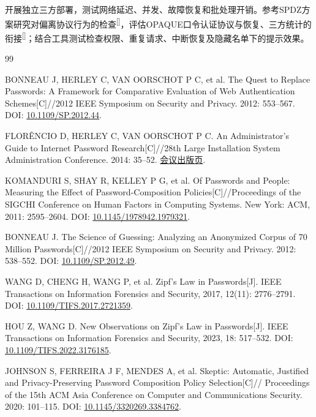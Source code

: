 \documentclass{crypto_report}
\renewcommand{\cite}[1]{\textsuperscript{[\citen{#1}]}}%
\begin{document}
开展独立三方部署，测试网络延迟、并发、故障恢复和批处理开销。参考SPDZ方案研究对偏离协议行为的检查\cite{damgard2012spdz}，评估OPAQUE口令认证协议与恢复、三方统计的衔接\cite{rfc9807opaque}；结合工具测试检查权限、重复请求、中断恢复及隐藏名单下的提示效果。

\clearpage
{}
{}
\renewcommand{\refname}{参考文献}
\begin{thebibliography}{99}

 BONNEAU J, HERLEY C, VAN OORSCHOT P C, et al. The Quest to Replace Passwords: A Framework for Comparative Evaluation of Web Authentication Schemes[C]//2012 IEEE Symposium on Security and Privacy. 2012: 553--567. DOI: \href{https://doi.org/10.1109/SP.2012.44}{10.1109/SP.2012.44}.

 FLORÊNCIO D, HERLEY C, VAN OORSCHOT P C. An Administrator's
Guide to Internet Password Research{[}C{]}//28th Large Installation
System Administration Conference. 2014: 35--52.
\href{https://www.usenix.org/conference/lisa14/conference-program/presentation/florencio}{会议出版页}.

 KOMANDURI S, SHAY R, KELLEY P G, et al. Of Passwords and People: Measuring the Effect of Password-Composition Policies[C]//Proceedings of the SIGCHI Conference on Human Factors in Computing Systems. New York: ACM, 2011: 2595--2604. DOI: \href{https://doi.org/10.1145/1978942.1979321}{10.1145/1978942.1979321}.

 BONNEAU J. The Science of Guessing: Analyzing an Anonymized Corpus of 70 Million Passwords[C]//2012 IEEE Symposium on Security and Privacy. 2012: 538--552. DOI: \href{https://doi.org/10.1109/SP.2012.49}{10.1109/SP.2012.49}.

 WANG D, CHENG H, WANG P, et al. Zipf's Law in Passwords{[}J{]}.
IEEE Transactions on Information Forensics and Security, 2017, 12(11): 2776--2791. DOI:
\href{https://doi.org/10.1109/TIFS.2017.2721359}{10.1109/TIFS.2017.2721359}.

 HOU Z, WANG D. New Observations on Zipf's Law in Passwords{[}J{]}.
IEEE Transactions on Information Forensics and Security, 2023, 18: 517--532. DOI:
\href{https://doi.org/10.1109/TIFS.2022.3176185}{10.1109/TIFS.2022.3176185}.

 JOHNSON S, FERREIRA J F, MENDES A, et al. Skeptic: Automatic,
Justified and Privacy-Preserving Password Composition Policy Selection{[}C{]}//
Proceedings of the 15th ACM Asia Conference on Computer and Communications Security.
2020: 101--115. DOI:
\href{https://doi.org/10.1145/3320269.3384762}{10.1145/3320269.3384762}.


\end{thebibliography}
\end{document}
